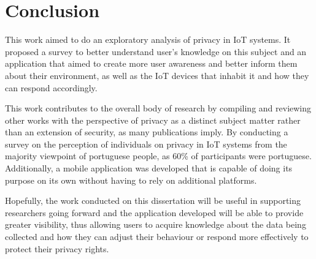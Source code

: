 %
%
\section{Conclusion}

This work aimed to do an exploratory analysis of privacy in IoT systems.
It proposed a survey to better understand user's knowledge on this subject
and an application that aimed to create more user awareness and better inform
them about their environment, as well as the IoT devices that inhabit it and
how they can respond accordingly.

This work contributes to the overall body of research by compiling and reviewing
other works with the perspective of privacy as a distinct subject matter rather than
an extension of security, as many publications imply. By conducting a survey
on the perception of individuals on privacy in IoT systems from the majority
viewpoint of portuguese people, as 60\% of participants were portuguese. Additionally,
a mobile application was developed that is capable of doing its purpose
on its own without having to rely on additional platforms.

Hopefully, the work conducted on this dissertation will be useful in
supporting researchers going forward and the application developed will be able to
provide greater visibility, thus allowing users to acquire knowledge about
the data being collected and how they can adjust their behaviour or respond
more effectively to protect their privacy rights.
